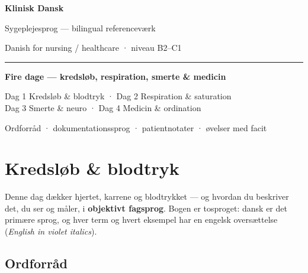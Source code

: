 \documentclass[11pt,a4paper]{report}
\newcommand{\eng}[1]{\textcolor{en}{\itshape #1}}       %
\begin{document}
\begin{titlepage}
\centering
\vspace*{3cm}
{\color{brandd}\Huge\bfseries Klinisk Dansk\par}
\vspace{0.4cm}
{\LARGE Sygeplejesprog — bilingual referenceværk\par}
\vspace{0.2cm}
{\large\color{muted}Danish for nursing / healthcare · niveau B2–C1\par}
\vspace{2.5cm}
{\color{brand}\rule{6cm}{2pt}\par}
\vspace{0.6cm}
{\Large\bfseries Fire dage --- kredsløb, respiration, smerte \& medicin\par}
\vspace{0.3cm}
{\large\color{muted}Dag 1 Kredsløb \& blodtryk · Dag 2 Respiration \& saturation\\
Dag 3 Smerte \& neuro · Dag 4 Medicin \& ordination\par}
\vfill
{\color{muted}Ordforråd · dokumentationssprog · patientnotater · øvelser med facit\par}
\end{titlepage}

\tableofcontents
\newpage

\chapter{Kredsløb \& blodtryk}

Denne dag dækker hjertet, karrene og blodtrykket --- og hvordan du beskriver det, du ser
og måler, i \textbf{objektivt fagsprog}. Bogen er tosproget: dansk er det primære sprog,
og hver term og hvert eksempel har en engelsk oversættelse (\eng{English in violet italics}).

\section{Ordforråd}
\end{document}
